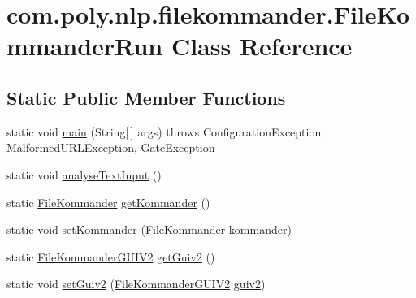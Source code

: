 \hypertarget{classcom_1_1poly_1_1nlp_1_1filekommander_1_1_file_kommander_run}{\section{com.\-poly.\-nlp.\-filekommander.\-File\-Kommander\-Run Class Reference}
\label{classcom_1_1poly_1_1nlp_1_1filekommander_1_1_file_kommander_run}
}
\subsection*{Static Public Member Functions}
\begin{DoxyCompactItemize}
\item 
static void \hyperlink{classcom_1_1poly_1_1nlp_1_1filekommander_1_1_file_kommander_run_a5927b17fe7f36dc411e57833ef2e9526}{main} (String\mbox{[}$\,$\mbox{]} args)  throws Configuration\-Exception, 			\-Malformed\-U\-R\-L\-Exception, Gate\-Exception 
\item 
static void \hyperlink{classcom_1_1poly_1_1nlp_1_1filekommander_1_1_file_kommander_run_ab9503413d54c7d1880931d9ee03e021d}{analyse\-Text\-Input} ()
\item 
static \hyperlink{classcom_1_1poly_1_1nlp_1_1filekommander_1_1_file_kommander}{File\-Kommander} \hyperlink{classcom_1_1poly_1_1nlp_1_1filekommander_1_1_file_kommander_run_afd37283a20f7115abfd53064c2ad87a2}{get\-Kommander} ()
\item 
static void \hyperlink{classcom_1_1poly_1_1nlp_1_1filekommander_1_1_file_kommander_run_aa8fe20066fea0bae38e0b0f3eb553713}{set\-Kommander} (\hyperlink{classcom_1_1poly_1_1nlp_1_1filekommander_1_1_file_kommander}{File\-Kommander} \hyperlink{classcom_1_1poly_1_1nlp_1_1filekommander_1_1_file_kommander_run_a2dffc1b40df78c82faf9567da220dae2}{kommander})
\item 
static \hyperlink{classcom_1_1poly_1_1nlp_1_1filekommander_1_1views_1_1_file_kommander_g_u_i_v2}{File\-Kommander\-G\-U\-I\-V2} \hyperlink{classcom_1_1poly_1_1nlp_1_1filekommander_1_1_file_kommander_run_a397a9a14b5802a79157fe7f90a9c49de}{get\-Guiv2} ()
\item 
static void \hyperlink{classcom_1_1poly_1_1nlp_1_1filekommander_1_1_file_kommander_run_acd6193926603bb658fd3a05d1477b4cf}{set\-Guiv2} (\hyperlink{classcom_1_1poly_1_1nlp_1_1filekommander_1_1views_1_1_file_kommander_g_u_i_v2}{File\-Kommander\-G\-U\-I\-V2} \hyperlink{classcom_1_1poly_1_1nlp_1_1filekommander_1_1_file_kommander_run_af105be529e7e9e9312aab57f6381b5ca}{guiv2})

\end{DoxyCompactItemize}
